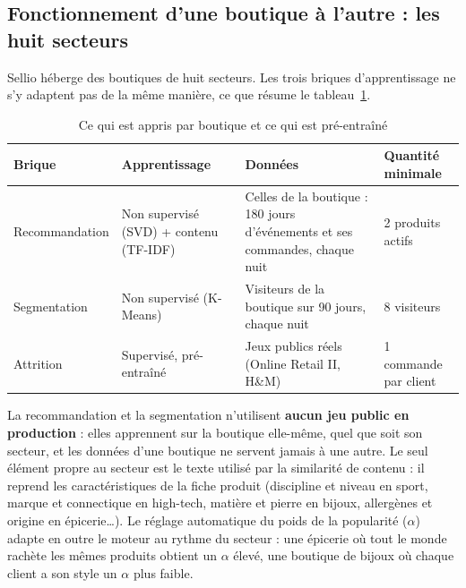 \subsection{Fonctionnement d'une boutique à l'autre : les huit secteurs}
Sellio héberge des boutiques de huit secteurs. Les trois briques d'apprentissage ne s'y adaptent pas de la même manière, ce que résume le tableau~\ref{tab:ml-par-brique}.
\begin{table}[H]
\centering
\renewcommand{\arraystretch}{1.3}
\small
\begin{tabular}{|p{3cm}|p{3.6cm}|p{4.2cm}|p{3.4cm}|}
\hline
\textbf{Brique} & \textbf{Apprentissage} & \textbf{Données} & \textbf{Quantité minimale} \\
\hline
Recommandation & Non supervisé (SVD) + contenu (TF-IDF) & Celles de la boutique : 180 jours d'événements et ses commandes, chaque nuit & 2 produits actifs \\
\hline
Segmentation & Non supervisé (K-Means) & Visiteurs de la boutique sur 90 jours, chaque nuit & 8 visiteurs \\
\hline
Attrition & Supervisé, pré-entraîné & Jeux publics réels (Online Retail II, H\&M) & 1 commande par client \\
\hline
\end{tabular}
\caption{Ce qui est appris par boutique et ce qui est pré-entraîné}
\label{tab:ml-par-brique}
\end{table}

La recommandation et la segmentation n'utilisent \textbf{aucun jeu public en production} : elles apprennent sur la boutique elle-même, quel que soit son secteur, et les données d'une boutique ne servent jamais à une autre. Le seul élément propre au secteur est le texte utilisé par la similarité de contenu : il reprend les caractéristiques de la fiche produit (discipline et niveau en sport, marque et connectique en high-tech, matière et pierre en bijoux, allergènes et origine en épicerie\dots). Le réglage automatique du poids de la popularité (\(\alpha\)) adapte en outre le moteur au rythme du secteur : une épicerie où tout le monde rachète les mêmes produits obtient un \(\alpha\) élevé, une boutique de bijoux où chaque client a son style un \(\alpha\) plus faible.

